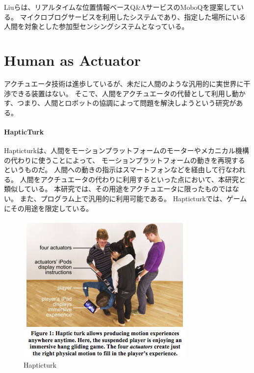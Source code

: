 \mbox{}

Liuらは、リアルタイムな位置情報ベースQ\&AサービスのMoboQを提案している\cite{moboq}。
マイクロブログサービスを利用したシステムであり、指定した場所にいる人間を対象とした参加型センシングシステムとなっている。

\section{Human as Actuator}\label{human-as-actuator}

アクチュエータ技術は進歩しているが、未だに人間のような汎用的に実世界に干渉できる装置はない。
そこで、人間をアクチュエータの代替として利用し動かす、つまり、人間とロボットの協調によって問題を解決しようという研究がある。

\paragraph{HapticTurk}\label{hapticturk}

\mbox{}

Hapticturk\cite{hapticturk}は、人間をモーションプラットフォームのモーターやメカニカル機構の代わりに使うことによって、
モーションプラットフォームの動きを再現するというものだ。
人間への動きの指示はスマートフォンなどを経由して行なわれる。
人間をアクチュエータの代わりに利用するといった点において、本研究と類似している。
本研究では、その用途をアクチュエータに限ったものではない。
また、プログラム上で汎用的に利用可能である。
Hapticturkでは、ゲームにその用途を限定している。

\begin{figure}[htbp]
  \begin{center}
  \includegraphics[width=.6\linewidth,bb=0 0 332 281]{images/hapticturk.png}
  \end{center}
  \caption{Hapticturk}
  \label{fig:hapticturk}
\end{figure}

